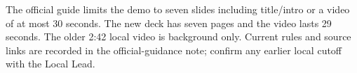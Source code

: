 The official guide limits the demo to seven slides including title/intro or a video of at most 30 seconds. The new deck has seven pages and the video lasts 29 seconds. The older 2:42 local video is background only. Current rules and source links are recorded in the official-guidance note; confirm any earlier local cutoff with the Local Lead.


